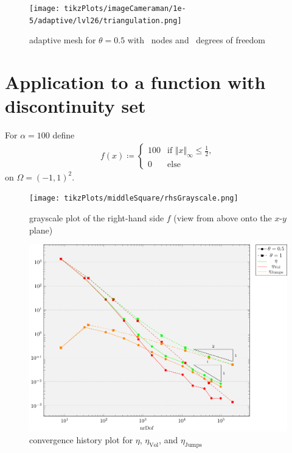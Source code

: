 \documentclass[draft=false,twoside,12pt]{scrreprt}
\begin{document}

\begin{figure}[H]
	\centering
  \texttt{[image: tikzPlots/imageCameraman/1e-5/adaptive/lvl26/triangulation.png]}
  \caption{adaptive mesh for $\theta = 0.5$ with \nrNodes\ nodes and 
  \nrDof\ degrees of freedom}
\end{figure}



\section{Application to a function with discontinuity set}
For $\alpha = 100$ define 
\begin{align}
  \label{equ:defMidSqu}
  f(x)\coloneqq 
  \begin{cases}
    100 &\text{if } \Vert x\Vert_\infty\leq \frac{1}{2},\\
    0 &\text{else}
  \end{cases}
\end{align}
on $\Omega = (-1,1)^2$.

\begin{figure}[H]
	\centering
	\texttt{[image: tikzPlots/middleSquare/rhsGrayscale.png]}
  \caption{grayscale plot of the right-hand side $f$ (view from above onto the
  $x$-$y$ plane)}
  \label{fig:rhsMiddleSquare}
\end{figure}

\begin{figure}[H]
	\centering
	\includegraphics[width=14cm]
  {tikzPlots/middleSquare/convergence.pdf}
  \caption{convergence history plot for $\eta$,
  $\eta_\text{Vol}$, and $\eta_\text{Jumps}$}
\end{figure}
\end{document}
